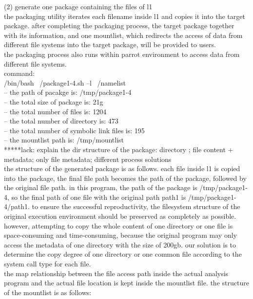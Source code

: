 \documentclass{article}
\begin{document}
(2) generate one package containing the files of l1 \\
the packaging utility iterates each filename inside l1 and copies it into the target package. after completing the packaging process, the target package together with its information, and one mountlist, which redirects the access of data from different file systems into the target package, will be provided to users.\\
the packaging process also runs within parrot environment to access data from different file systems.\\
command:\\
/bin/bash ~/package1-4.sh –l ~/namelist\\
– the path of pacakge is: /tmp/package1-4\\
– the total size of package is: 21g\\
– the total number of files is: 1204\\
– the total number of directory is: 473\\
– the total number of symbolic link files is: 195\\
– the mountlist path is: /tmp/mountlist\\

*****lack: explain the dir structure of the package:  directory ; file content + metadata; only file metadata; different process solutions\\

the structure of the generated package is as follows. each file inside l1 is copied into the package, the final file path becomes the path of the package, followed by the original file path. in this program, the path of the package is /tmp/package1-4, so the final path of one file with the original path path1 is /tmp/package1-4/path1.
to ensure the successful reproductivity, the filesystem structure of the original execution environment should be preserved as completely as possible. however, attempting to copy the whole content of one directory or one file is space-consuming and time-consuming, because the original program may only access the metadata of one directory with the size of 200gb. our solution is to determine the copy degree of one directory or one common file according to the system call type for each file.\\


the map relationship between the file access path inside the actual analysis program and the actual file location is kept inside the mountlist file. the structure of the mountlist is as follows:\\
\end{document}
